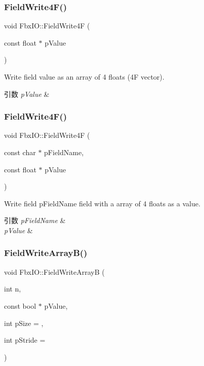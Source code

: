 \subsubsection{\texorpdfstring{Field\+Write4\+F()}{FieldWrite4F()}\hspace{0.1cm}{\footnotesize\ttfamily [1/2]}}
{\footnotesize\ttfamily void Fbx\+I\+O\+::\+Field\+Write4F (\begin{DoxyParamCaption}\item[{const float $\ast$}]{p\+Value }\end{DoxyParamCaption})}

Write field value as an array of 4 floats (4F vector). 
\begin{DoxyParams}{引数}
{\em p\+Value} & \\
\hline
\end{DoxyParams}
\mbox{\label{class_fbx_i_o_ae62b4899ca45c340663c6589ed2f653d}} 
\subsubsection{\texorpdfstring{Field\+Write4\+F()}{FieldWrite4F()}\hspace{0.1cm}{\footnotesize\ttfamily [2/2]}}
{\footnotesize\ttfamily void Fbx\+I\+O\+::\+Field\+Write4F (\begin{DoxyParamCaption}\item[{const char $\ast$}]{p\+Field\+Name,  }\item[{const float $\ast$}]{p\+Value }\end{DoxyParamCaption})}

Write field p\+Field\+Name field with a array of 4 floats as a value. 
\begin{DoxyParams}{引数}
{\em p\+Field\+Name} & \\
\hline
{\em p\+Value} & \\
\hline
\end{DoxyParams}
\mbox{\label{class_fbx_i_o_abef29a51a9c6fac344540c6502825e30}} 
\subsubsection{\texorpdfstring{Field\+Write\+Array\+B()}{FieldWriteArrayB()}}
{\footnotesize\ttfamily void Fbx\+I\+O\+::\+Field\+Write\+ArrayB (\begin{DoxyParamCaption}\item[{int}]{n,  }\item[{const bool $\ast$}]{p\+Value,  }\item[{int}]{p\+Size = {},  }\item[{int}]{p\+Stride = {} }\end{DoxyParamCaption})}

